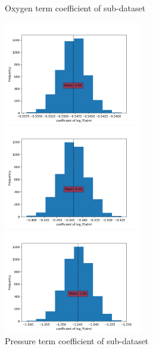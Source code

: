 \documentclass[preprint,12pt]{elsarticle}
\begin{document}
\begin{figure}[H]
\begin{multicols}{3}
				    	\end{multicols}
				    	\caption{Oxygen  term coefficient of sub-dataset}
				    	\begin{multicols}{3}
				    		\includegraphics[width=6cm]{logP0.png}\par 
				    		\includegraphics[width=6cm]{logP1.png}\par 
				    		\includegraphics[width=6cm]{logP2.png}\par 
				    	\end{multicols}
				    	\caption{Pressure term coefficient of sub-dataset}			
				    \end{figure}
				    
\end{document}
